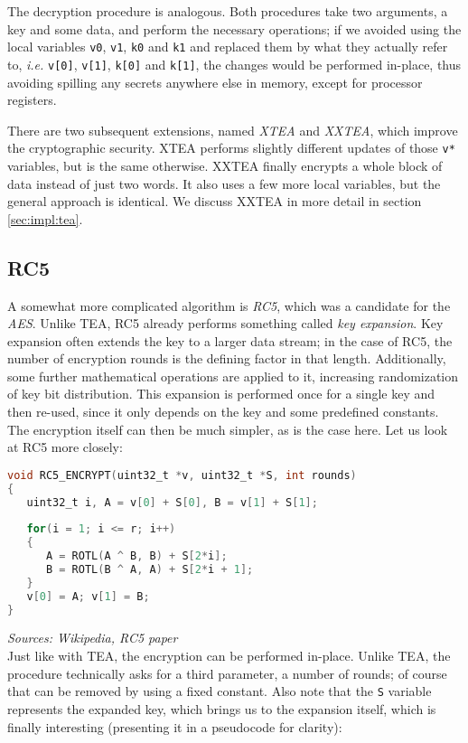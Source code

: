 \documentclass[a4paper,10pt,openright]{memoir}
\newcommand{\ie}{\emph{i.e.}\xspace}
\newcommand{\term}[1]{\textit{#1}}
\newcommand{\code}[1]{\texttt{#1}}
\begin{document}
The decryption procedure is analogous. Both procedures take two 
arguments, a key and some data, and perform the necessary operations; 
if we avoided using the local variables \code{v0}, \code{v1}, \code{k0} 
and \code{k1} and replaced them by what they actually refer to, \ie 
\code{v[0]}, \code{v[1]}, \code{k[0]} and \code{k[1]}, the changes 
would be performed in-place, thus avoiding spilling any secrets 
anywhere else in memory, except for processor registers.

There are two subsequent extensions, named \term{XTEA} and 
\term{XXTEA}, which improve the cryptographic security. XTEA performs 
slightly different updates of those \code{v*} variables, but is the 
same otherwise. XXTEA finally encrypts a whole block of data instead of 
just two words. It also uses a few more local variables, but the 
general approach is identical. We discuss XXTEA in more detail in 
section \ref{sec:impl:tea}.

\subsection{RC5}

A somewhat more complicated algorithm is \term{RC5}, which was a 
candidate for the \term{AES}. Unlike TEA, RC5 already performs 
something called \term{key expansion}. Key expansion often extends the 
key to a larger data stream; in the case of RC5, the number of 
encryption rounds is the defining factor in that length. Additionally, 
some further mathematical operations are applied to it, increasing 
randomization of key bit distribution. This expansion is performed once 
for a single key and then re-used, since it only depends on the key and 
some predefined constants. The encryption itself can then be much 
simpler, as is the case here. Let us look at RC5 more closely:

\begin{lstlisting}[language=C]
void RC5_ENCRYPT(uint32_t *v, uint32_t *S, int rounds)
{
   uint32_t i, A = v[0] + S[0], B = v[1] + S[1];
   
   for(i = 1; i <= r; i++)
   {
      A = ROTL(A ^ B, B) + S[2*i];
      B = ROTL(B ^ A, A) + S[2*i + 1];
   }
   v[0] = A; v[1] = B;
}
\end{lstlisting}
\textit{\footnotesize Sources: Wikipedia, RC5 paper}\\

Just like with TEA, the encryption can be performed in-place. Unlike 
TEA, the procedure technically asks for a third parameter, a number of 
rounds; of course that can be removed by using a fixed constant. Also 
note that the \code{S} variable represents the expanded key, which 
brings us to the expansion itself, which is finally interesting 
(presenting it in a pseudocode for clarity):
\end{document}
